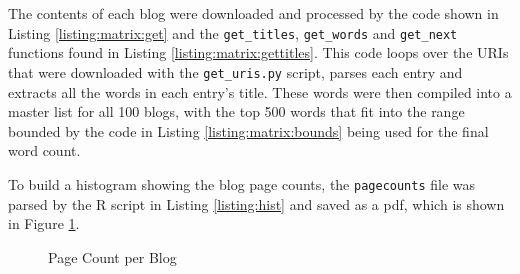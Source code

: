 The contents of each blog were downloaded and processed by the code shown in Listing \ref{listing:matrix:get} and the {\tt get\_titles}, {\tt get\_words} and {\tt get\_next} functions found in Listing \ref{listing:matrix:gettitles}. This code loops over the URIs that were downloaded with the {\tt get\_uris.py} script, parses each entry and extracts all the words in each entry's title. These words were then compiled into a master list for all 100 blogs, with the top 500 words that fit into the range bounded by the code in Listing \ref{listing:matrix:bounds} being used for the final word count. 



\clearpage





To build a histogram showing the blog page counts, the {\tt pagecounts} file was parsed by the R script in Listing \ref{listing:hist} and saved as a pdf, which is shown in Figure \ref{fig:hist}.



\clearpage

\begin{figure}[h!]
\centering
{}
\caption{Page Count per Blog}
\label{fig:hist}
\end{figure}